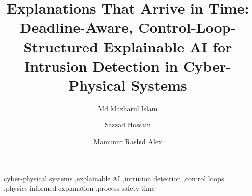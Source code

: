 \documentclass[preprint,12pt,authoryear,longtitle]{elsarticle}
\begin{document}
\begin{frontmatter}
\title{Explanations That Arrive in Time: Deadline-Aware, Control-Loop-Structured Explainable AI for Intrusion Detection in Cyber-Physical Systems}

\author{Md Mazharul Islam}

\author{Sazzad Hossain}

\author{Mamunur Rashid Alex}

\address{Department of Electrical and Computer Engineering, North South University, Bashundhara, Dhaka 1229, Bangladesh}

\begin{abstract}

\end{abstract}

\begin{keyword}
cyber-physical systems \sep explainable AI \sep intrusion detection \sep control loops \sep physics-informed explanation \sep process safety time
\end{keyword}
\end{frontmatter}














\end{document}
